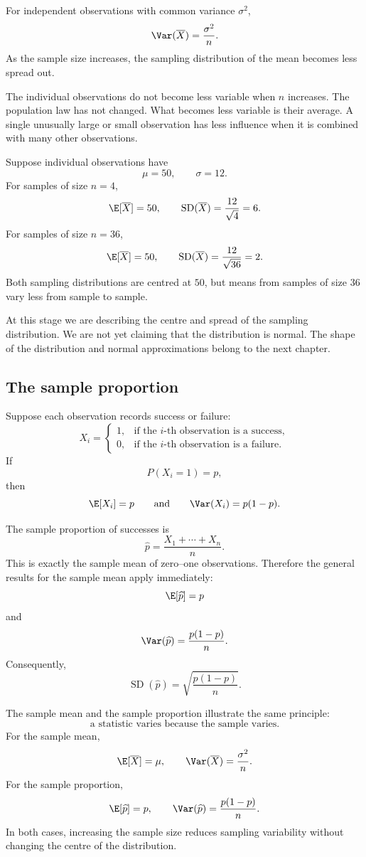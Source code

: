 \begin{theorembox}
For independent observations with common variance \(\sigma^2\),
\[
\Var(\overline X)=\frac{\sigma^2}{n}.
\]
As the sample size increases, the sampling distribution of the mean becomes less
spread out.
\end{theorembox}

The individual observations do not become less variable when \(n\) increases.
The population law has not changed. What becomes less variable is their average.
A single unusually large or small observation has less influence when it is
combined with many other observations.

\begin{examplebox}
Suppose individual observations have
\[
\mu=50,
\qquad
\sigma=12.
\]
For samples of size \(n=4\),
\[
\E[\overline X]=50,
\qquad
\operatorname{SD}(\overline X)=\frac{12}{\sqrt4}=6.
\]
For samples of size \(n=36\),
\[
\E[\overline X]=50,
\qquad
\operatorname{SD}(\overline X)=\frac{12}{\sqrt{36}}=2.
\]
Both sampling distributions are centred at \(50\), but means from samples of
size \(36\) vary less from sample to sample.
\end{examplebox}

At this stage we are describing the centre and spread of the sampling
distribution. We are not yet claiming that the distribution is normal. The shape
of the distribution and normal approximations belong to the next chapter.

\subsection*{The sample proportion}

Suppose each observation records success or failure:
\[
X_i=
\begin{cases}
1,&\text{if the }i\text{-th observation is a success},\\
0,&\text{if the }i\text{-th observation is a failure}.
\end{cases}
\]
If
\[
P(X_i=1)=p,
\]
then
\[
\E[X_i]=p
\qquad\text{and}\qquad
\Var(X_i)=p(1-p).
\]

The sample proportion of successes is
\[
\widehat p
=
\frac{X_1+\cdots+X_n}{n}.
\]
This is exactly the sample mean of zero--one observations. Therefore the general
results for the sample mean apply immediately:
\[
\E[\widehat p]=p
\]
and
\[
\Var(\widehat p)=\frac{p(1-p)}{n}.
\]
Consequently,
\[
\operatorname{SD}(\widehat p)
=
\sqrt{\frac{p(1-p)}{n}}.
\]

\begin{summarybox}
The sample mean and the sample proportion illustrate the same principle:
\[
\text{a statistic varies because the sample varies.}
\]
For the sample mean,
\[
\E[\overline X]=\mu,
\qquad
\Var(\overline X)=\frac{\sigma^2}{n}.
\]
For the sample proportion,
\[
\E[\widehat p]=p,
\qquad
\Var(\widehat p)=\frac{p(1-p)}{n}.
\]
In both cases, increasing the sample size reduces sampling variability without
changing the centre of the distribution.
\end{summarybox}
